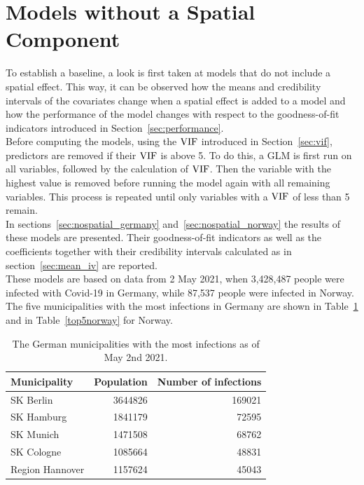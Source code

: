 \section{Models without a Spatial Component}\label{sec:nospatial}
To establish a baseline, a look is first taken at models that do not include a spatial effect. This way, it can be observed how the means and credibility intervals of the covariates change when a spatial effect is added to a model and how the performance of the model changes with respect to the goodness-of-fit indicators introduced in Section~\ref{sec:performance}. \\
Before computing the models, using the $\hbox{VIF}$ introduced in Section~\ref{sec:vif}, predictors are removed if their $\hbox{VIF}$ is above 5. To do this, a GLM is first run on all variables, followed by the calculation of $\hbox{VIF}$. Then the variable with the highest value is removed before running the model again with all remaining variables. This process is repeated until only variables with a $\hbox{VIF}$ of less than 5 remain. \\
In sections~\ref{sec:nospatial_germany} and~\ref{sec:nospatial_norway} the results of these models are presented. Their goodness-of-fit indicators as well as the coefficients together with their credibility intervals calculated as in section~\ref{sec:mean_iv} are reported. \\
These models are based on data from 2 May 2021, when 3,428,487 people were infected with Covid-19 in Germany, while 87,537 people were infected in Norway. The five municipalities with the most infections in Germany are shown in Table~\ref{top5germany} and in Table~\ref{top5norway} for Norway.
\begin{table}[H] 
\caption{The German municipalities with the most infections as of May 2nd 2021. \label{top5germany}}
\begin{tabular}{l r r}
\toprule
\textbf{Municipality}	& \textbf{Population}	& \textbf{Number of infections} \\
\midrule
SK Berlin & 3644826 & 169021  \\   
SK Hamburg & 1841179 & 72595  \\
SK Munich & 1471508 & 68762  \\
SK Cologne & 1085664 & 48831  \\
Region Hannover & 1157624 & 45043  \\
\bottomrule
\end{tabular}
\end{table}
